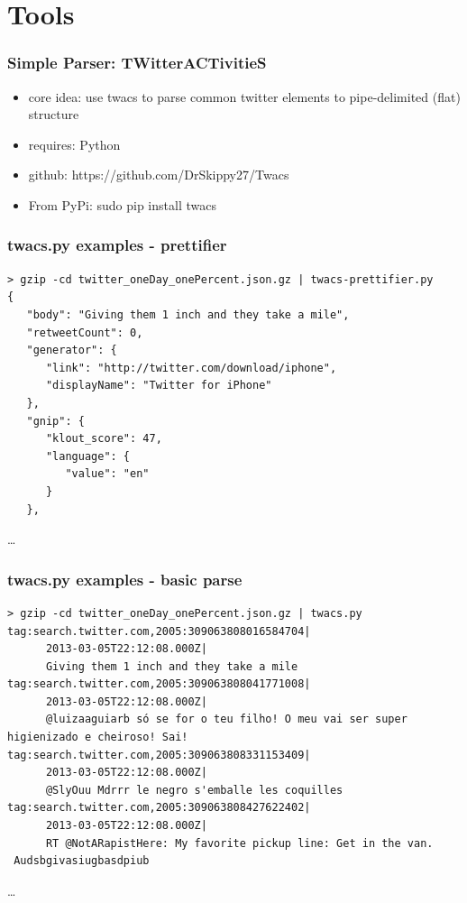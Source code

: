 \documentclass{beamer}
\begin{document}
\section{Tools}

\begin{frame}\frametitle{Simple Parser: TWitterACTivitieS}
\begin{itemize}
\item core idea: use twacs to parse common twitter elements to pipe-delimited (flat) structure
\item requires: Python
\item github: https://github.com/DrSkippy27/Twacs
\item From PyPi: sudo pip install twacs 
\end{itemize}
\end{frame}

\begin{frame}[fragile]
\frametitle{twacs.py examples - prettifier}
\begin{verbatim}
> gzip -cd twitter_oneDay_onePercent.json.gz | twacs-prettifier.py 
{
   "body": "Giving them 1 inch and they take a mile", 
   "retweetCount": 0, 
   "generator": {
      "link": "http://twitter.com/download/iphone", 
      "displayName": "Twitter for iPhone"
   }, 
   "gnip": {
      "klout_score": 47, 
      "language": {
         "value": "en"
      }
   }, 
\end{verbatim}
\ldots
\end{frame}

\begin{frame}[fragile]
\frametitle{twacs.py examples - basic parse}
\begin{verbatim}
> gzip -cd twitter_oneDay_onePercent.json.gz | twacs.py 
tag:search.twitter.com,2005:309063808016584704|
      2013-03-05T22:12:08.000Z|
      Giving them 1 inch and they take a mile
tag:search.twitter.com,2005:309063808041771008|
      2013-03-05T22:12:08.000Z|
      @luizaaguiarb só se for o teu filho! O meu vai ser super higienizado e cheiroso! Sai!
tag:search.twitter.com,2005:309063808331153409|
      2013-03-05T22:12:08.000Z|
      @SlyOuu Mdrrr le negro s'emballe les coquilles
tag:search.twitter.com,2005:309063808427622402|
      2013-03-05T22:12:08.000Z|
      RT @NotARapistHere: My favorite pickup line: Get in the van.
 Audsbgivasiugbasdpiub
\end{verbatim}
\ldots
\end{frame}
\end{document}
